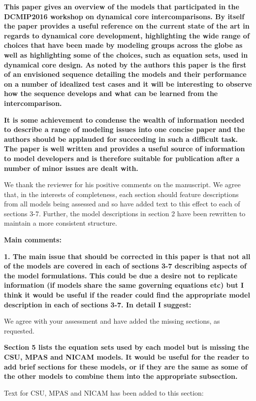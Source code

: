 \documentclass{article}
\begin{document}
\textbf{{This paper gives an overview of the models that participated in the DCMIP2016 workshop
on dynamical core intercomparisons. By itself the paper provides a useful reference
on the current state of the art in regards to dynamical core development, highlighting
the wide range of choices that have been made by modeling groups across
the globe as well as highlighting some of the choices, such as equation sets, used in
dynamical core design. As noted by the authors this paper is the first of an envisioned
sequence detailing the models and their performance on a number of idealized test
cases and it will be interesting to observe how the sequence develops and what can
be learned from the intercomparison.}}

\textbf{{It is some achievement to condense the wealth of information needed to describe a
range of modeling issues into one concise paper and the authors should be applauded
for succeeding in such a difficult task. The paper is well written and provides a useful
source of information to model developers and is therefore suitable for publication after
a number of minor issues are dealt with.}}

We thank the reviewer for his positive comments on the manuscript.  We agree that, in the interests of completeness, each section should feature descriptions from all models being assessed and so have added text to this effect to each of sections 3-7.  Further, the model descriptions in section 2 have been rewritten to maintain a more consistent structure.

\textbf{{Main comments:}}

\textbf{{1. The main issue that should be corrected in this paper is that not all of the models
are covered in each of sections 3-7 describing aspects of the model formulations.
This could be due a desire not to replicate information (if models share the same
governing equations etc) but I think it would be useful if the reader could find the
appropriate model description in each of sections 3-7. In detail I suggest:}}

We agree with your assessment and have added the missing sections, as requested.

\textbf{{Section 5 lists the equation sets used by each model but is missing the
CSU, MPAS and NICAM models. It would be useful for the reader to add
brief sections for these models, or if they are the same as some of the other
models to combine them into the appropriate subsection.}}

Text for CSU, MPAS and NICAM has been added to this section:
\end{document}
